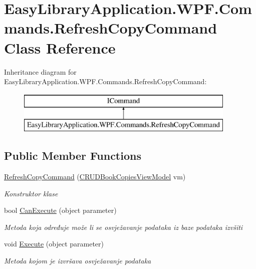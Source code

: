 \hypertarget{class_easy_library_application_1_1_w_p_f_1_1_commands_1_1_refresh_copy_command}{}\section{Easy\+Library\+Application.\+W\+P\+F.\+Commands.\+Refresh\+Copy\+Command Class Reference}
\label{class_easy_library_application_1_1_w_p_f_1_1_commands_1_1_refresh_copy_command}
Inheritance diagram for Easy\+Library\+Application.\+W\+P\+F.\+Commands.\+Refresh\+Copy\+Command\+:\begin{figure}[H]
\begin{center}
\leavevmode
\includegraphics[height=2.000000cm]{class_easy_library_application_1_1_w_p_f_1_1_commands_1_1_refresh_copy_command}
\end{center}
\end{figure}
\subsection*{Public Member Functions}
\begin{DoxyCompactItemize}
\item 
\mbox{\hyperlink{class_easy_library_application_1_1_w_p_f_1_1_commands_1_1_refresh_copy_command_ae066f01d18cb0fa8ce275b2e287cc530}{Refresh\+Copy\+Command}} (\mbox{\hyperlink{class_easy_library_application_1_1_w_p_f_1_1_view_model_1_1_c_r_u_d_book_copies_view_model}{C\+R\+U\+D\+Book\+Copies\+View\+Model}} vm)
\begin{DoxyCompactList}\small\item\em Konstruktor klase \end{DoxyCompactList}\item 
bool \mbox{\hyperlink{class_easy_library_application_1_1_w_p_f_1_1_commands_1_1_refresh_copy_command_ae3f80e95e8ac264e5d620d3e11b0648f}{Can\+Execute}} (object parameter)
\begin{DoxyCompactList}\small\item\em Metoda koja određuje može li se osvježavanje podataka iz baze podataka izvšiti \end{DoxyCompactList}\item 
void \mbox{\hyperlink{class_easy_library_application_1_1_w_p_f_1_1_commands_1_1_refresh_copy_command_aa635dd7fe96e6c9dc99840531113c56b}{Execute}} (object parameter)
\begin{DoxyCompactList}\small\item\em Metoda kojom je izvršava osvježavanje podataka \end{DoxyCompactList}\end{DoxyCompactItemize}
